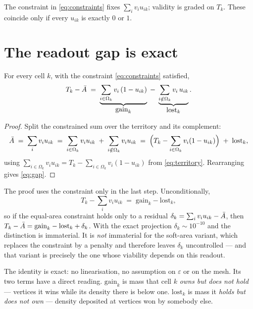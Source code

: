 \documentclass[11pt,a4paper]{article}
\begin{document}
The constraint in \eqref{eq:constraints} fixes $\sum_i v_i u_{ik}$; validity is
graded on $T_k$. These coincide only if every $u_{ik}$ is exactly $0$ or $1$.

\section{The readout gap is exact}

\begin{prop}
For every cell $k$, with the constraint \eqref{eq:constraints} satisfied,
\begin{equation}
  T_k - \bar{A} \;=\; \underbrace{\sum_{i \in \Omega_k} v_i\,(1 - u_{ik})}_{\textstyle \mathrm{gain}_k}
  \;-\; \underbrace{\sum_{i \notin \Omega_k} v_i\, u_{ik}}_{\textstyle \mathrm{lost}_k} .
  \label{eq:gap}
\end{equation}
\end{prop}

\begin{proof}
Split the constrained sum over the territory and its complement:
\[
  \bar{A} \;=\; \sum_i v_i u_{ik}
        \;=\; \sum_{i \in \Omega_k} v_i u_{ik} \;+\; \sum_{i \notin \Omega_k} v_i u_{ik}
        \;=\; \Big( T_k - \sum_{i \in \Omega_k} v_i (1-u_{ik}) \Big) \;+\; \mathrm{lost}_k ,
\]
using $\sum_{i \in \Omega_k} v_i u_{ik} = T_k - \sum_{i \in \Omega_k} v_i(1-u_{ik})$
from \eqref{eq:territory}. Rearranging gives \eqref{eq:gap}.
\end{proof}

\begin{remark}
\label{rem:unconstrained}
The proof uses the constraint only in the last step. Unconditionally,
\[
  T_k - \sum_i v_i u_{ik} \;=\; \mathrm{gain}_k - \mathrm{lost}_k ,
\]
so if the equal-area constraint holds only to a residual
$\delta_k = \sum_i v_i u_{ik} - \bar{A}$, then $T_k - \bar{A} = \mathrm{gain}_k -
\mathrm{lost}_k + \delta_k$. With the exact projection $\delta_k \sim 10^{-10}$
and the distinction is immaterial. It is \emph{not} immaterial for the soft-area
variant, which replaces the constraint by a penalty and therefore leaves $\delta_k$
uncontrolled --- and that variant is precisely the one whose viability depends on
this readout.
\end{remark}

The identity is exact: no linearisation, no assumption on $\varepsilon$ or on the mesh.
Its two terms have a direct reading. $\mathrm{gain}_k$ is mass that cell $k$ \emph{owns
but does not hold} --- vertices it wins while its density there is below one.
$\mathrm{lost}_k$ is mass it \emph{holds but does not own} --- density deposited at
vertices won by somebody else.
\end{document}
